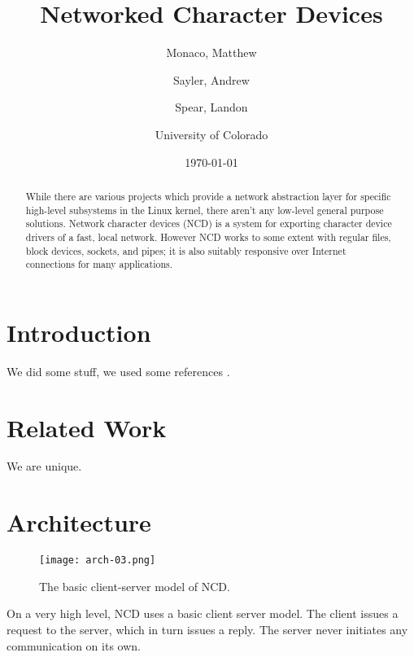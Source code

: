 \documentclass[11pt,twocolumn]{article}
\begin{document}
\title{Networked Character Devices}
\author{Monaco, Matthew \and Sayler, Andrew \and Spear, Landon
  \\ \and University of Colorado}
\date{\today}

\maketitle

\begin{abstract}
While there are various projects which provide a network abstraction layer for
specific high-level subsystems in the Linux kernel, there aren't any low-level
general purpose solutions. Network character devices (NCD) is a system for
exporting character device drivers of a fast, local network. However NCD works
to some extent with regular files, block devices, sockets, and pipes; it is also
suitably responsive over Internet connections for many applications.
\end{abstract}


\section{Introduction}
\label{sec:introduction}

We did some stuff, we used some references \cite{ldd3}.

\section{Related Work}
\label{sec:relatedwork}

We are unique.


\section{Architecture}
\label{sec:architecture}

\begin{figure}[h]
  \begin{center}
    \texttt{[image: arch-03.png]}
  \end{center}
  \caption{The basic client-server model of NCD.}
  \label{fig:architecture}
\end{figure}

On a very high level, NCD uses a basic client server model. The client
issues a request to the server, which in turn issues a reply. The
server never initiates any communication on its own.
\end{document}
